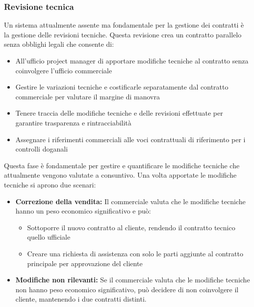 \documentclass[12pt, a4paper]{article}
\begin{document}
\subsubsection{Revisione tecnica}

Un sistema attualmente assente ma fondamentale per la gestione dei contratti è la gestione delle revisioni tecniche.
Questa revisione crea un contratto parallelo senza obblighi legali che consente di:

\begin{itemize}
      \item All'ufficio project manager di apportare modifiche tecniche al contratto senza coinvolgere l'ufficio commerciale
      \item Gestire le variazioni tecniche e costificarle separatamente dal contratto commerciale per valutare il margine di manovra
      \item Tenere traccia delle modifiche tecniche e delle revisioni effettuate per garantire trasparenza e rintracciabilità
      \item Assegnare i riferimenti commerciali alle voci contrattuali di riferimento per i controlli doganali
\end{itemize}

Questa fase è fondamentale per gestire e quantificare le modifiche tecniche che attualmente vengono valutate a consuntivo.
Una volta apportate le modifiche tecniche si aprono due scenari:

\begin{itemize}
      \item \textbf{Correzione della vendita:} Il commerciale valuta che le modifiche tecniche hanno un peso economico significativo e può:
            \begin{itemize}
                  \item Sottoporre il nuovo contratto al cliente, rendendo il contratto tecnico quello ufficiale
                  \item Creare una richiesta di assistenza con solo le parti aggiunte al contratto principale per approvazione del cliente
            \end{itemize}

      \item \textbf{Modifiche non rilevanti:} Se il commerciale valuta che le modifiche tecniche non hanno peso economico significativo, può decidere di non coinvolgere il cliente, mantenendo i due contratti distinti.
\end{itemize}
\end{document}
